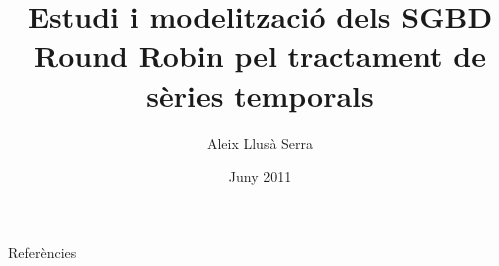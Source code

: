 \documentclass[catalan]{beamer}
\title%
   [SGBD Round Robin per a sèries temporals]%
   {Estudi i modelització dels SGBD Round Robin 
     pel tractament de sèries temporals}
\author[A. Llusà]{%
  Aleix Llusà Serra}
\institute[Màster Automàtica UPC]
{
  {\large Universitat Politècnica de Catalunya} \\
  Màster en Automàtica i Robòtica 
}
\date{Juny 2011}
\begin{document}











\begin{frame}[allowframebreaks]
{Referències}

\printbibliography

\end{frame}
\end{document}
